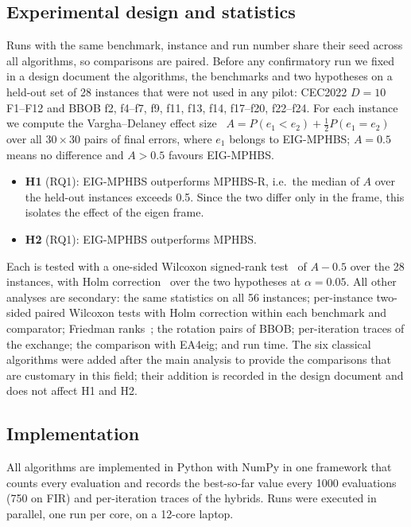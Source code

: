 \documentclass[preprint,12pt,authoryear]{elsarticle}
\theoremstyle{remark}
\begin{document}
\subsection{Experimental design and statistics}
\label{sec:design}
Runs with the same benchmark, instance and run number share their seed across all algorithms, so comparisons are
paired. Before any confirmatory run we fixed in a design document the algorithms, the benchmarks and two hypotheses on a
held-out set of 28 instances that were not used in any pilot: CEC2022 $D=10$ F1--F12 and BBOB f2, f4--f7, f9, f11, f13,
f14, f17--f20, f22--f24. For each instance we compute the Vargha--Delaney effect size~\citep{vargha2000}
$A=P(e_1<e_2)+\tfrac12P(e_1=e_2)$ over all $30\times30$ pairs of final errors, where $e_1$ belongs to EIG-MPHBS; $A=0.5$
means no difference and $A>0.5$ favours EIG-MPHBS.
\begin{itemize}
\item \textbf{H1} (RQ1): EIG-MPHBS outperforms MPHBS-R, i.e.\ the median of $A$ over the held-out instances exceeds
0.5. Since the two differ only in the frame, this isolates the effect of the eigen frame.
\item \textbf{H2} (RQ1): EIG-MPHBS outperforms MPHBS.
\end{itemize}
Each is tested with a one-sided Wilcoxon signed-rank test~\citep{wilcoxon1945} of $A-0.5$ over the 28 instances, with
Holm correction~\citep{holm1979} over the two hypotheses at $\alpha=0.05$. All other analyses are secondary: the same
statistics on all 56 instances; per-instance two-sided paired Wilcoxon tests with Holm correction within each benchmark
and comparator; Friedman ranks~\citep{derrac2011tutorial,demsar2006}; the rotation pairs of BBOB; per-iteration traces
of the exchange; the comparison with EA4eig; and run time. The six classical algorithms were added after the main
analysis to provide the comparisons that are customary in this field; their addition is recorded in the design document
and does not affect H1 and H2.

\subsection{Implementation}
All algorithms are implemented in Python with NumPy in one framework that counts every evaluation and records the
best-so-far value every 1000 evaluations (750 on FIR) and per-iteration traces of the hybrids. Runs were executed in
parallel, one run per core, on a 12-core laptop.

\end{document}
